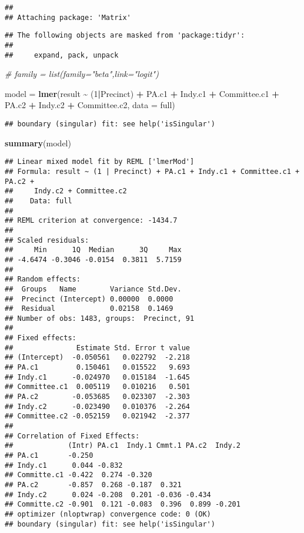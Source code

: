 \documentclass[
]{article}
\newenvironment{Shaded}{\begin{snugshade}}{\end{snugshade}}
\newcommand{\AttributeTok}[1]{\textcolor[rgb]{0.13,0.29,0.53}{#1}}
\newcommand{\CommentTok}[1]{\textcolor[rgb]{0.56,0.35,0.01}{\textit{#1}}}
\newcommand{\DecValTok}[1]{\textcolor[rgb]{0.00,0.00,0.81}{#1}}
\newcommand{\FunctionTok}[1]{\textcolor[rgb]{0.13,0.29,0.53}{\textbf{#1}}}
\newcommand{\NormalTok}[1]{#1}
\newcommand{\OtherTok}[1]{\textcolor[rgb]{0.56,0.35,0.01}{#1}}
\newcommand{\SpecialCharTok}[1]{\textcolor[rgb]{0.81,0.36,0.00}{\textbf{#1}}}
\begin{document}
\begin{verbatim}
## 
## Attaching package: 'Matrix'
\end{verbatim}

\begin{verbatim}
## The following objects are masked from 'package:tidyr':
## 
##     expand, pack, unpack
\end{verbatim}

\begin{Shaded}
\begin{Highlighting}[]
\CommentTok{\# family = list(family="beta",link="logit")}

\NormalTok{model }\OtherTok{=} \FunctionTok{lmer}\NormalTok{(result }\SpecialCharTok{\textasciitilde{}}\NormalTok{ (}\DecValTok{1}\SpecialCharTok{|}\NormalTok{Precinct) }\SpecialCharTok{+}\NormalTok{ PA.c1 }\SpecialCharTok{+}\NormalTok{ Indy.c1 }\SpecialCharTok{+}\NormalTok{ Committee.c1 }\SpecialCharTok{+}\NormalTok{ PA.c2 }\SpecialCharTok{+}\NormalTok{ Indy.c2 }\SpecialCharTok{+}\NormalTok{ Committee.c2, }\AttributeTok{data =}\NormalTok{ full)}
\end{Highlighting}
\end{Shaded}

\begin{verbatim}
## boundary (singular) fit: see help('isSingular')
\end{verbatim}

\begin{Shaded}
\begin{Highlighting}[]
\FunctionTok{summary}\NormalTok{(model)}
\end{Highlighting}
\end{Shaded}

\begin{verbatim}
## Linear mixed model fit by REML ['lmerMod']
## Formula: result ~ (1 | Precinct) + PA.c1 + Indy.c1 + Committee.c1 + PA.c2 +  
##     Indy.c2 + Committee.c2
##    Data: full
## 
## REML criterion at convergence: -1434.7
## 
## Scaled residuals: 
##     Min      1Q  Median      3Q     Max 
## -4.6474 -0.3046 -0.0154  0.3811  5.7159 
## 
## Random effects:
##  Groups   Name        Variance Std.Dev.
##  Precinct (Intercept) 0.00000  0.0000  
##  Residual             0.02158  0.1469  
## Number of obs: 1483, groups:  Precinct, 91
## 
## Fixed effects:
##               Estimate Std. Error t value
## (Intercept)  -0.050561   0.022792  -2.218
## PA.c1         0.150461   0.015522   9.693
## Indy.c1      -0.024970   0.015184  -1.645
## Committee.c1  0.005119   0.010216   0.501
## PA.c2        -0.053685   0.023307  -2.303
## Indy.c2      -0.023490   0.010376  -2.264
## Committee.c2 -0.052159   0.021942  -2.377
## 
## Correlation of Fixed Effects:
##             (Intr) PA.c1  Indy.1 Cmmt.1 PA.c2  Indy.2
## PA.c1       -0.250                                   
## Indy.c1      0.044 -0.832                            
## Committe.c1 -0.422  0.274 -0.320                     
## PA.c2       -0.857  0.268 -0.187  0.321              
## Indy.c2      0.024 -0.208  0.201 -0.036 -0.434       
## Committe.c2 -0.901  0.121 -0.083  0.396  0.899 -0.201
## optimizer (nloptwrap) convergence code: 0 (OK)
## boundary (singular) fit: see help('isSingular')
\end{verbatim}
\end{document}
